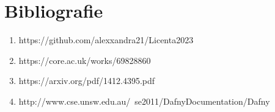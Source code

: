 \chapter*{Bibliografie} 

\begin{enumerate}
	\item https://github.com/alexxandra21/Licenta2023
	\item https://core.ac.uk/works/69828860
	\item https://arxiv.org/pdf/1412.4395.pdf
	\item http://www.cse.unsw.edu.au/~se2011/DafnyDocumentation/Dafny%
\end{enumerate}